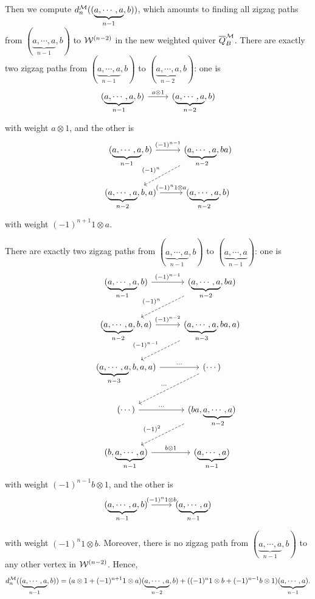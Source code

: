 \documentclass[10pt, reqno]{amsart}
\theoremstyle{definition}
\theoremstyle{remark}
\numberwithin{equation}{section}
\begin{document}
Then we compute \(d_n^{\mathcal{M}}((\underbrace{a, \cdots,a}_{n-1},b))\), which amounts to finding all zigzag paths from $(\underbrace{a, \cdots,a}_{n-1},b)$ to  $\mathcal{W}^{(n-2)}$ in the new weighted quiver $\overline{Q}_B^{\mathcal{M}}$.
There are exactly two zigzag paths from \((\underbrace{a, \cdots,a}_{n-1},b)\) to \((\underbrace{a, \cdots,a}_{n-2},b)\):  one is
\[
\begin{tikzcd}
 (\underbrace{a, \cdots,a}_{n-1},b) \arrow[r,"a \otimes 1"]  & (\underbrace{a, \cdots,a}_{n-2},b) 
\end{tikzcd}
\]
with weight $a \otimes 1$, and the other is
\[\begin{tikzcd}
   & (\underbrace{a, \cdots,a}_{n-1},b) \arrow[r,"(-1)^{n-1}"] & (\underbrace{a, \cdots,a}_{n-2},ba) \arrow[ld,dashed,"(-1)^n",swap] \\
   & (\underbrace{a, \cdots,a}_{n-2},b,a) \arrow[r,"(-1)^n1\otimes a"]  & (\underbrace{a, \cdots,a}_{n-2},b) 
\end{tikzcd}\]
with weight $(-1)^{n+1}1 \otimes a$.

There are exactly two zigzag paths from \((\underbrace{a, \cdots,a}_{n-1},b)\) to \((\underbrace{a, \cdots,a}_{n-1})\): one is
\[\begin{tikzcd}
   & (\underbrace{a, \cdots,a}_{n-1},b) \arrow[r,"(-1)^{n-1}"] & (\underbrace{a, \cdots,a}_{n-2},ba) \arrow[ld,dashed,"(-1)^n",swap]\\
   & (\underbrace{a, \cdots,a}_{n-2},b,a) \arrow[r,"(-1)^{n-2}"]  & (\underbrace{a, \cdots,a}_{n-3},ba,a) \arrow[ld,dashed,"(-1)^{n-1}",swap]\\
   & (\underbrace{a, \cdots,a}_{n-3},b,a,a) \arrow[r,"\cdots"]  & (\cdots) \arrow[ld,dashed,"\cdots",swap]\\
   &(\cdots) \arrow[r,"\cdots"] & (ba,\underbrace{a, \cdots,a}_{n-2}) \arrow[ld,dashed,"(-1)^{2}",swap]\\
   &(b,\underbrace{a, \cdots,a}_{n-1}) \arrow[r,"b \otimes 1"] & (\underbrace{a, \cdots,a}_{n-1})
\end{tikzcd}\]
with weight $(-1)^{n-1} b \otimes 1$, and the other is
\[
\begin{tikzcd}
 (\underbrace{a, \cdots,a}_{n-1},b) \arrow[r,"(-1)^n 1 \otimes b"]  & (\underbrace{a, \cdots,a}_{n-1}) 
\end{tikzcd}
\]
with weight $(-1)^n 1 \otimes b$.
Moreover, there is no zigzag path from \((\underbrace{a, \cdots,a}_{n-1},b)\) to any other vertex in \(\mathcal{W}^{(n-2)}\). Hence,
\[d_n^{\mathcal{M}}((\underbrace{a, \cdots,a}_{n-1},b) )=(a\otimes 1+(-1)^{n+1}1\otimes a)(\underbrace{a, \cdots,a}_{n-2},b)+((-1)^n 1\otimes b+(-1)^{n-1}b\otimes1)(\underbrace{a, \cdots,a}_{n-1}).\] 
\end{document}
